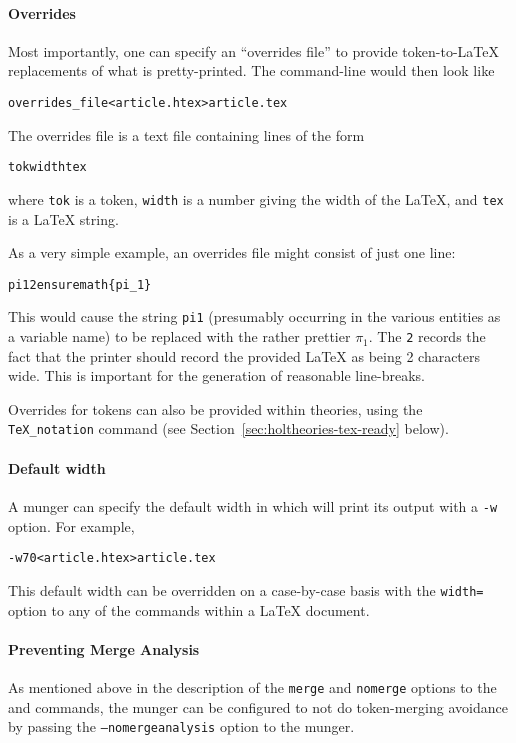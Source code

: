 \paragraph{Overrides}
Most importantly, one can specify an ``overrides file'' to provide
token-to-\LaTeX{} replacements of what is pretty-printed.
%
The command-line would then look like
\begin{alltt}
   \munge overrides_file < article.htex > article.tex
\end{alltt}
The overrides file is a text file containing lines of the form
\begin{alltt}
   tok width tex
\end{alltt}
where \texttt{tok} is a \HOL{} token, \texttt{width} is a number
giving the width of the \LaTeX{}, and \texttt{tex} is a \LaTeX{}
string.

As a very simple example, an overrides file might consist of just one
line:
\begin{alltt}
   pi1 2 \bs{}ensuremath\{\bs{}pi_1\}
\end{alltt}
This would cause the string \texttt{pi1} (presumably occurring in the
various \HOL{} entities as a variable name) to be replaced with the
rather prettier $\pi_1$.
%
The \texttt{2} records the fact that the
printer should record the provided \LaTeX{} as being 2 characters
wide.
%
This is important for the generation of reasonable line-breaks.

Overrides for \HOL{} tokens can also be provided within \HOL{}
theories, using the
\texttt{TeX\_notation} command (see
Section~\ref{sec:holtheories-tex-ready} below).

\paragraph{Default width}
A munger can specify the default width in which \HOL{} will print its
output with a \texttt{-w} option.
%
For example,
\begin{alltt}
   \munge -w70 < article.htex > article.tex
\end{alltt}
This default width can be overridden on a case-by-case basis with the
\texttt{width=} option to any of the commands within a \LaTeX{}
document.

\paragraph{Preventing Merge Analysis}  As mentioned above in the description of the \texttt{merge} and \texttt{nomerge} options to the \holtm{} and \holthm{} commands, the munger can be configured to not do token-merging avoidance by passing the \texttt{--nomergeanalysis} option to the munger.

